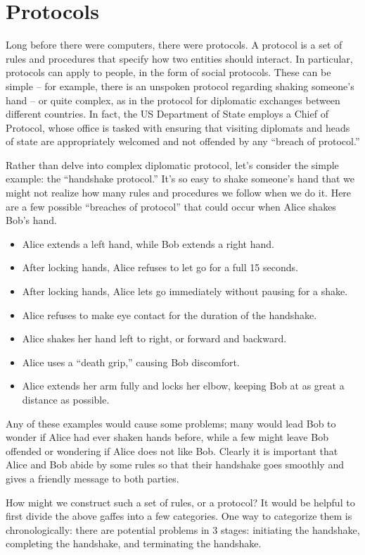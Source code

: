 \section{Protocols}

Long before there were computers, there were protocols. A protocol is a set of rules and procedures that specify how two entities should interact. In particular, protocols can apply to people, in the form of social protocols. These can be simple -- for example, there is an unspoken protocol regarding shaking someone's hand -- or quite complex, as in the protocol for diplomatic exchanges between different countries. In fact, the US Department of State employs a Chief of Protocol, whose office is tasked with ensuring that visiting diplomats and heads of state are appropriately welcomed and not offended by any ``breach of protocol.''

Rather than delve into complex diplomatic protocol, let's consider the simple example: the ``handshake protocol.'' It's so easy to shake someone's hand that we might not realize how many rules and procedures we follow when we do it. Here are a few possible ``breaches of protocol'' that could occur when Alice shakes Bob's hand.
\begin{itemize}
    \item Alice extends a left hand, while Bob extends a right hand.
    \item After locking hands, Alice refuses to let go for a full 15 seconds.
    \item After locking hands, Alice lets go immediately without pausing for a shake.
    \item Alice refuses to make eye contact for the duration of the handshake.
    \item Alice shakes her hand left to right, or forward and backward.
    \item Alice uses a ``death grip,'' causing Bob discomfort.
    \item Alice extends her arm fully and locks her elbow, keeping Bob at as great a distance as possible.
  \end{itemize}
Any of these examples would cause some problems; many would lead Bob to wonder if Alice had ever shaken hands before, while a few might leave Bob offended or wondering if Alice does not like Bob. Clearly it is important that Alice and Bob abide by some rules so that their handshake goes smoothly and gives a friendly message to both parties.

How might we construct such a set of rules, or a protocol? It would be helpful to first divide the above gaffes into a few categories. One way to categorize them is chronologically: there are potential problems in 3 stages: initiating the handshake, completing the handshake, and terminating the handshake.

